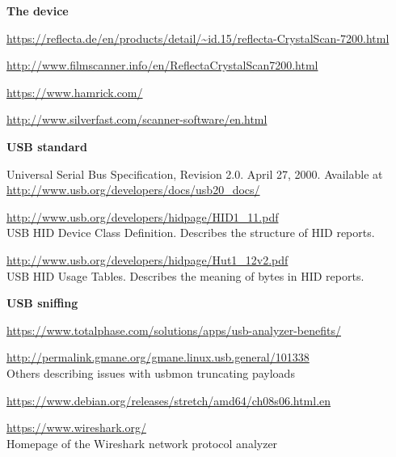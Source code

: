 \documentclass{article}
\begin{document}
\renewcommand{\refname}{Links}
\begin{thebibliography}{}
  \setcounter{enumiv}{\value{firstbib}}
  \item[]\hspace{-\labelwidth}\hspace{-\labelsep}\textbf{The device}
  
  \url{https://reflecta.de/en/products/detail/~id.15/reflecta-CrystalScan-7200.html}
  
  \url{http://www.filmscanner.info/en/ReflectaCrystalScan7200.html}
  
  \url{https://www.hamrick.com/}
  
  \url{http://www.silverfast.com/scanner-software/en.html}
  
  \item[]\hspace{-\labelwidth}\hspace{-\labelsep}\textbf{USB standard}
  
   Universal Serial Bus Specification, Revision 2.0.
                   April 27, 2000. Available at
                   \url{http://www.usb.org/developers/docs/usb20_docs/}

  \url{http://www.usb.org/developers/hidpage/HID1_11.pdf} \\
  USB HID Device Class Definition. Describes the structure of HID reports.
  
  \url{http://www.usb.org/developers/hidpage/Hut1_12v2.pdf} \\
  USB HID Usage Tables. Describes the meaning of bytes in HID reports.

  \item[]\hspace{-\labelwidth}\hspace{-\labelsep}\textbf{USB sniffing}


  \url{https://www.totalphase.com/solutions/apps/usb-analyzer-benefits/}

  \url{http://permalink.gmane.org/gmane.linux.usb.general/101338} \\
  Others describing issues with {\it} usbmon truncating payloads
  
  \url{https://www.debian.org/releases/stretch/amd64/ch08s06.html.en}

  \url{https://www.wireshark.org/} \\
  Homepage of the Wireshark network protocol analyzer
  

\end{thebibliography}
\end{document}
